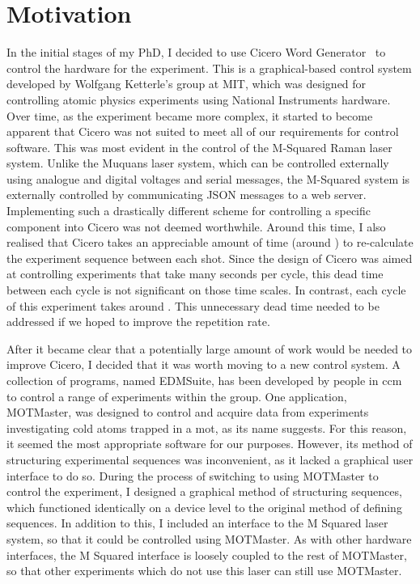 \section{Motivation}
In the initial stages of my PhD, I decided to use Cicero Word
Generator~\cite{Keshet2012} to control the hardware for the experiment. This
is a graphical-based control system developed by Wolfgang Ketterle's group at
MIT, which was designed for controlling atomic physics experiments using
National Instruments hardware. Over time, as the experiment became more
complex, it started to become apparent that Cicero was not suited to meet all
of our requirements for control software. This was most evident in the
control of the M-Squared Raman laser system. Unlike the Muquans laser system,
which can be controlled externally using analogue and digital voltages and
serial messages, the M-Squared system is externally controlled by
communicating JSON messages to a web server. Implementing such a drastically
different scheme for controlling a specific component into Cicero was not
deemed worthwhile. Around this time, I also realised that Cicero takes an
appreciable amount of time (around ) to
re-calculate the experiment sequence between each shot. Since the design of
Cicero was aimed at controlling experiments that take many seconds per cycle,
this dead time between each cycle is not significant on those time scales. In
contrast, each cycle of this experiment takes around
. This unnecessary dead time needed to be
addressed if we hoped to improve the repetition rate. \par\noindent
After it became clear that a potentially large amount of work would be needed
to improve Cicero, I decided that it was worth moving to a new control
system. A collection of programs, named EDMSuite, has been developed by
people in \ac{ccm} to control a range of experiments within the group. One
application, MOTMaster, was designed to control and acquire data from
experiments investigating cold atoms trapped in a \ac{mot}, as its name
suggests. For this reason, it seemed the most appropriate software for our
purposes. However, its method of structuring experimental sequences was
inconvenient, as it lacked a graphical user interface to do so. During the
process of switching to using MOTMaster to control the experiment, I designed
a graphical method of structuring sequences, which functioned identically on
a device level to the original method of defining sequences. In addition to
this, I included an interface to the M Squared laser system, so that it could
be controlled using MOTMaster. As with other hardware interfaces, the M
Squared interface is loosely coupled to the rest of MOTMaster, so that other
experiments which do not use this laser can still use MOTMaster.

